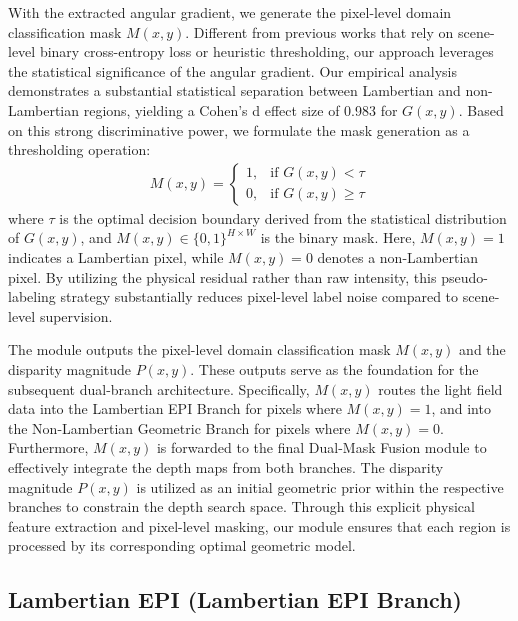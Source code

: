 With the extracted angular gradient, we generate the pixel-level domain classification mask $M(x,y)$. Different from previous works that rely on scene-level binary cross-entropy loss or heuristic thresholding, our approach leverages the statistical significance of the angular gradient. Our empirical analysis demonstrates a substantial statistical separation between Lambertian and non-Lambertian regions, yielding a Cohen's d effect size of 0.983 for $G(x,y)$. Based on this strong discriminative power, we formulate the mask generation as a thresholding operation:
\begin{align}
M(x,y) = \begin{cases} 1, & \text{if } G(x,y) < \tau \\ 0, & \text{if } G(x,y) \ge \tau \end{cases}
\end{align}
where $\tau$ is the optimal decision boundary derived from the statistical distribution of $G(x,y)$, and $M(x,y) \in \{0, 1\}^{H \times W}$ is the binary mask. Here, $M(x,y) = 1$ indicates a Lambertian pixel, while $M(x,y) = 0$ denotes a non-Lambertian pixel. By utilizing the physical residual rather than raw intensity, this pseudo-labeling strategy substantially reduces pixel-level label noise compared to scene-level supervision.

The module outputs the pixel-level domain classification mask $M(x,y)$ and the disparity magnitude $P(x,y)$. These outputs serve as the foundation for the subsequent dual-branch architecture. Specifically, $M(x,y)$ routes the light field data into the Lambertian EPI Branch for pixels where $M(x,y)=1$, and into the Non-Lambertian Geometric Branch for pixels where $M(x,y)=0$. Furthermore, $M(x,y)$ is forwarded to the final Dual-Mask Fusion module to effectively integrate the depth maps from both branches. The disparity magnitude $P(x,y)$ is utilized as an initial geometric prior within the respective branches to constrain the depth search space. Through this explicit physical feature extraction and pixel-level masking, our module ensures that each region is processed by its corresponding optimal geometric model.

\subsection{Lambertian EPI (Lambertian EPI Branch)}

